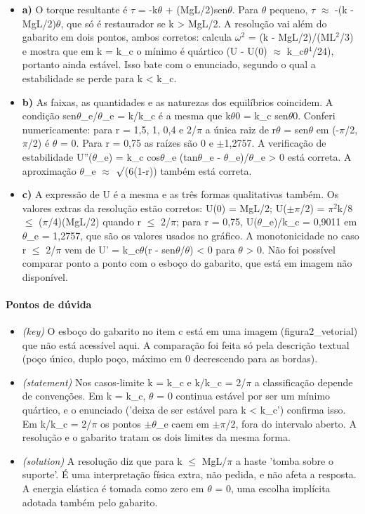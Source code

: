 \documentclass{article}%
\begin{document}
\begin{itemize}%
\item%
\textbf{a)} O torque resultante é $\tau$ = -k$\theta$ + (MgL/2)sen$\theta$. Para $\theta$ pequeno, $\tau$ $\approx$ -(k - MgL/2)$\theta$, que só é restaurador se k > MgL/2. A resolução vai além do gabarito em dois pontos, ambos corretos: calcula $\omega$$^2$ = (k - MgL/2)/(ML$^2$/3) e mostra que em k = k\_c o mínimo é quártico (U - U(0) $\approx$ k\_c$\theta$$^{4}$/24), portanto ainda estável. Isso bate com o enunciado, segundo o qual a estabilidade se perde para k < k\_c.%
\item%
\textbf{b)} As faixas, as quantidades e as naturezas dos equilíbrios coincidem. A condição sen$\theta$\_e/$\theta$\_e = k/k\_c é a mesma que k$\theta$0 = k\_c sen$\theta$0. Conferi numericamente: para r = 1,5, 1, 0,4 e 2/$\pi$ a única raiz de r$\theta$ = sen$\theta$ em (-$\pi$/2, $\pi$/2) é $\theta$ = 0. Para r = 0,75 as raízes são 0 e $\pm$1,2757. A verificação de estabilidade U''($\theta$\_e) = k\_c cos$\theta$\_e (tan$\theta$\_e - $\theta$\_e)/$\theta$\_e > 0 está correta. A aproximação $\theta$\_e $\approx$ $\surd$(6(1-r)) também está correta.%
\item%
\textbf{c)} A expressão de U é a mesma e as três formas qualitativas também. Os valores extras da resolução estão corretos: U(0) = MgL/2; U($\pm$$\pi$/2) = $\pi$$^2$k/8 $\leq$ ($\pi$/4)(MgL/2) quando r $\leq$ 2/$\pi$; para r = 0,75, U($\theta$\_e)/k\_c = 0,9011 em $\theta$\_e = 1,2757, que são os valores usados no gráfico. A monotonicidade no caso r $\leq$ 2/$\pi$ vem de U' = k\_c$\theta$(r - sen$\theta$/$\theta$) < 0 para $\theta$ > 0. Não foi possível comparar ponto a ponto com o esboço do gabarito, que está em imagem não disponível.%
\end{itemize}%
\paragraph{Pontos de dúvida}%
\begin{itemize}%
\item%
\textit{(key)} O esboço do gabarito no item c está em uma imagem (figura2\_vetorial) que não está acessível aqui. A comparação foi feita só pela descrição textual (poço único, duplo poço, máximo em 0 decrescendo para as bordas).%
\item%
\textit{(statement)} Nos casos{-}limite k = k\_c e k/k\_c = 2/$\pi$ a classificação depende de convenções. Em k = k\_c, $\theta$ = 0 continua estável por ser um mínimo quártico, e o enunciado ('deixa de ser estável para k < k\_c') confirma isso. Em k/k\_c = 2/$\pi$ os pontos $\pm$$\theta$\_e caem em $\pm$$\pi$/2, fora do intervalo aberto. A resolução e o gabarito tratam os dois limites da mesma forma.%
\item%
\textit{(solution)} A resolução diz que para k $\leq$ MgL/$\pi$ a haste 'tomba sobre o suporte'. É uma interpretação física extra, não pedida, e não afeta a resposta. A energia elástica é tomada como zero em $\theta$ = 0, uma escolha implícita adotada também pelo gabarito.%
\end{itemize}%
\end{document}
